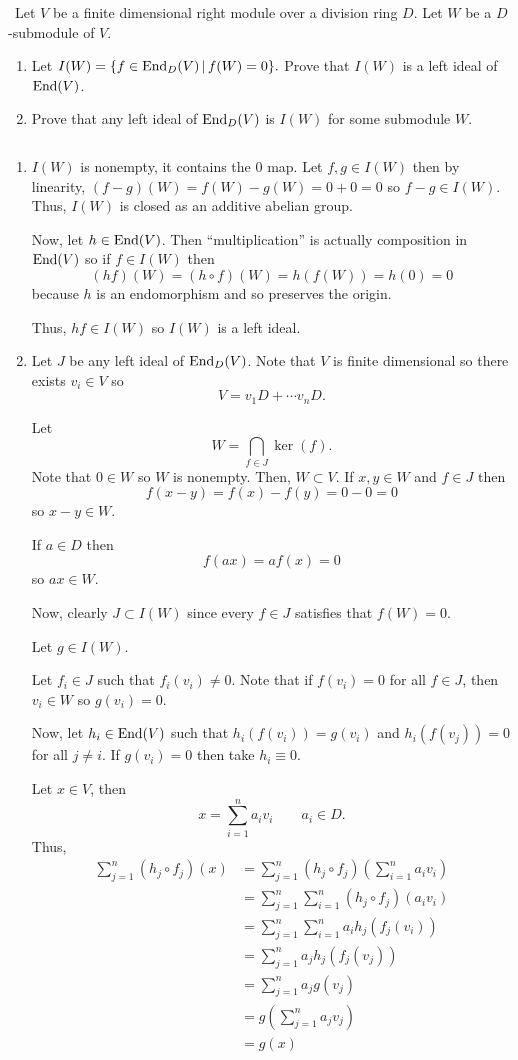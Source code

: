 \documentclass[12pt]{AlgebraQual}
\begin{document}
\newpage



\begin{problem} $\,$
Let $V$ be a finite dimensional right module over a division ring $D.$ Let $W$ be a $D$-submodule of $V$.
\begin{enumerate}[label=(\alph*)]
    \item Let $I(W)=\{f\in\text{End}_D(V)\,|\,f(W)=0\}.$ Prove that $I(W)$ is a left ideal of $\text{End}(V)$.
    \item Prove that any left ideal of $\text{End}_D(V)$ is $I(W)$ for some submodule $W$.
\end{enumerate}
\end{problem}


\begin{solution}$\,$
\begin{enumerate}[label=(\alph*)]
    \item  $I(W)$ is nonempty, it contains the $0$ map. Let $f,g\in I(W)$ then by linearity, $(f-g)(W)=f(W)-g(W)=0+0=0$ so $f-g\in I(W)$. Thus, $I(W)$ is closed as an additive abelian group.

    Now, let $h\in\text{End}(V)$. Then ``multiplication'' is actually composition in $\text{End}(V)$ so if $f\in I(W)$ then $$(hf)(W)=(h\circ f)(W)=h(f(W))=h(0)=0$$ because $h$ is an endomorphism and so preserves the origin.

    Thus, $hf\in I(W)$ so $I(W)$ is a left ideal.
    \item Let $J$ be any left ideal of $\text{End}_D(V)$. Note that $V$ is finite dimensional so there exists $v_i\in V$ so $$V=v_1D+\cdots v_nD.$$

    Let $$W=\bigcap_{f\in J}\ker(f).$$ Note that $0\in W$ so $W$ is nonempty. Then, $W\subset V.$ If $x,y\in W$ and $f\in J$ then $$f(x-y)=f(x)-f(y)=0-0=0$$ so $x-y\in W.$

    If $a\in D$ then $$f(ax)=af(x)=0$$ so $ax\in W.$

    Now, clearly $J\subset I(W)$ since every $f\in J$ satisfies that $f(W)=0.$

    Let $g\in I(W)$.

    Let $f_i\in J$ such that $f_i(v_i)\not=0.$ Note that if $f(v_i)=0$ for all $f\in J$, then $v_i\in W$ so $g(v_i)=0.$

    Now, let $h_i\in\text{End}(V)$ such that $h_i(f(v_i))=g(v_i)$ and $h_i(f(v_j))=0$ for all $j\not=i$. If $g(v_i)=0$ then take $h_i\equiv 0.$

    Let $x\in V$, then $$x=\sum_{i=1}^na_iv_i\qquad a_i\in D.$$ Thus, \begin{align*}
        \sum_{j=1}^n(h_j\circ f_j)(x)&=\sum_{j=1}^n\left(h_j\circ f_j\right)\left(\sum_{i=1}^na_iv_i\right)\\
        &=\sum_{j=1}^n\sum_{i=1}^n(h_j\circ f_j)(a_iv_i)\\
        &=\sum_{j=1}^n\sum_{i=1}^na_ih_j(f_j(v_i))\\
        &=\sum_{j=1}^na_jh_j(f_j(v_j))\\
        &=\sum_{j=1}^na_jg(v_j)\\
        &=g\left(\sum_{j=1}^na_jv_j\right)\\
        &=g(x)
    \end{align*}


\end{enumerate}
\end{solution}
\end{document}
